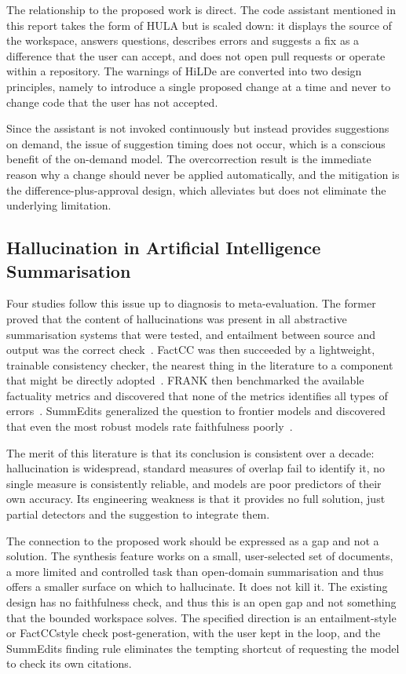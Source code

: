 \documentclass{FastFyp}
\begin{document}
The relationship to the proposed work is direct. The code assistant mentioned in this report takes the form of HULA but is scaled down: it displays the source of the workspace, answers questions, describes errors and suggests a fix as a difference that the user can accept, and does not open pull requests or operate within a repository. The warnings of HiLDe are converted into two design principles, namely to introduce a single proposed change at a time and never to change code that the user has not accepted.

Since the assistant is not invoked continuously but instead provides suggestions on demand, the issue of suggestion timing does not occur, which is a conscious benefit of the on-demand model. The overcorrection result is the immediate reason why a change should never be applied automatically, and the mitigation is the difference-plus-approval design, which alleviates but does not eliminate the underlying limitation.

\subsection{Hallucination in Artificial Intelligence Summarisation}
Four studies follow this issue up to diagnosis to meta-evaluation. The former proved that the content of hallucinations was present in all abstractive summarisation systems that were tested, and entailment between source and output was the correct check~\cite{ref:maynez2020}. FactCC was then succeeded by a lightweight, trainable consistency checker, the nearest thing in the literature to a component that might be directly adopted~\cite{ref:kryscinski2020}. FRANK then benchmarked the available factuality metrics and discovered that none of the metrics identifies all types of errors~\cite{ref:pagnoni2021}. SummEdits generalized the question to frontier models and discovered that even the most robust models rate faithfulness poorly~\cite{ref:laban2023}.

The merit of this literature is that its conclusion is consistent over a decade: hallucination is widespread, standard measures of overlap fail to identify it, no single measure is consistently reliable, and models are poor predictors of their own accuracy. Its engineering weakness is that it provides no full solution, just partial detectors and the suggestion to integrate them.

The connection to the proposed work should be expressed as a gap and not a solution. The synthesis feature works on a small, user-selected set of documents, a more limited and controlled task than open-domain summarisation and thus offers a smaller surface on which to hallucinate. It does not kill it. The existing design has no faithfulness check, and thus this is an open gap and not something that the bounded workspace solves. The specified direction is an entailment-style or FactCCstyle check post-generation, with the user kept in the loop, and the SummEdits finding rule eliminates the tempting shortcut of requesting the model to check its own citations.
\end{document}
